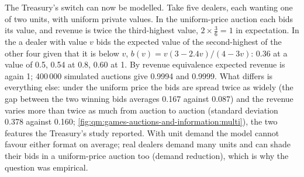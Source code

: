 The Treasury's switch can now be modelled. Take five dealers, each wanting one of two units, with uniform private values. In the uniform-price auction each bids its value, and revenue is twice the third-highest
value, $2 \times \frac36 = 1$ in expectation. In the  a dealer with value $v$ bids the expected value of the second-highest of the other four given that it is below $v$, $b(v) = v(3 - 2.4v)/(4 -
3v)$: 0.36 at a value of 0.5, 0.54 at 0.8, 0.60 at 1. By revenue equivalence expected revenue is again 1; 400\,000 simulated auctions give 0.9994 and 0.9999. What differs is everything else: under the uniform price the
bids are spread twice as widely (the gap between the two winning bids averages 0.167 against 0.087) and the revenue varies more than twice as much from auction to auction (standard deviation 0.378 against 0.160;
\cref{fig:qm:games-auctions-and-information:multi}), the two features the Treasury's study reported. With unit demand the model cannot favour either format on average; real dealers demand many units and can
shade their bids in a uniform-price auction too (demand reduction), which is why the question was empirical.

\begin{omfigure}

\label{fig:qm:games-auctions-and-information:multi}
\end{omfigure}

